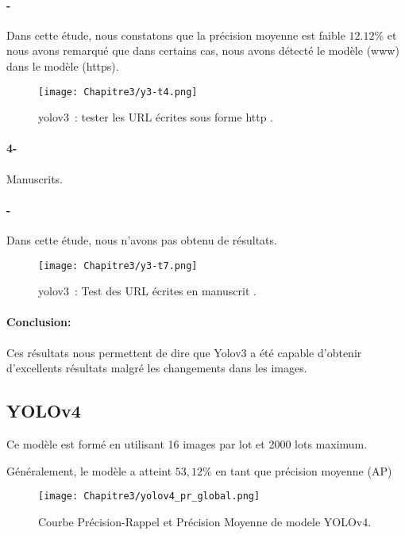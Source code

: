       \paragraph{-} Dans cette étude, nous constatons que  la précision moyenne  est faible $12.12\%$ et nous avons remarqué que dans certains cas, nous avons détecté le modèle (www) dans le modèle (https).
      
      \begin{figure}[H]
          \centering
           \texttt{[image: Chapitre3/y3-t4.png]}
           \caption{yolov3 : tester les URL écrites sous forme http .}
           \label{y3_t4}
           \end{figure}


      \paragraph{4-} Manuscrits.
      \paragraph{-} Dans cette étude, nous n'avons pas obtenu de résultats.

      \begin{figure}[H]
          \centering
           \texttt{[image: Chapitre3/y3-t7.png]}
           \caption{yolov3 : Test des URL écrites en manuscrit .}
           \label{y3_t7}
           \end{figure}

      \paragraph{Conclusion:} Ces résultats nous permettent de dire que Yolov3 a été capable d'obtenir d'excellents résultats malgré les changements dans les images.     

     \subsection{YOLOv4}
     Ce modèle est formé en utilisant 16 images par lot et 2000 lots maximum.

     Généralement, le modèle a atteint $53,12\%$ en tant que précision moyenne (AP)
     \begin{figure}[H]
               \centering
               \texttt{[image: Chapitre3/yolov4\_pr\_global.png]}
               \caption{Courbe Précision-Rappel et Précision Moyenne de modele YOLOv4.}
               \label{y4_pr}
               \end{figure}
     

